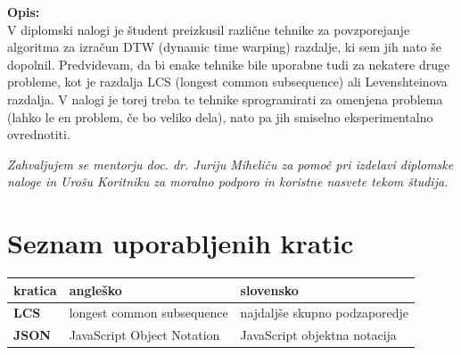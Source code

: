 \documentclass[a4paper,12pt,openright]{book}
\newcommand{\clearemptydoublepage}{\newpage{\pagestyle{empty}\cleardoublepage}}
\begin{document}
\bigskip
\noindent\textbf{Opis:}\\
V diplomski nalogi \cite{diplomaPremk} je študent preizkusil različne tehnike za povzporejanje algoritma za izračun DTW (dynamic time warping) razdalje, ki sem jih nato še dopolnil. Predvidevam, da bi enake tehnike bile uporabne tudi za nekatere druge probleme, kot je razdalja LCS (longest common subsequence) ali Levenshteinova razdalja. V nalogi je torej treba te tehnike sprogramirati za omenjena problema (lahko le en problem, če bo veliko dela), nato pa jih smiselno eksperimentalno ovrednotiti.


\vfill

\vspace{2cm}

\clearemptydoublepage

\thispagestyle{empty}\mbox{}\vfill\null\it%
\noindent
Zahvaljujem se mentorju doc. dr. Juriju Miheliču za pomoč pri izdelavi diplomske naloge in Urošu Koritniku za moralno podporo in koristne nasvete tekom študija. 
\rm\normalfont

\clearemptydoublepage

\thispagestyle{empty}\mbox{}{\textheight}\mbox{}\hfill\begin{minipage}{0.55\textwidth}%
\normalfont\end{minipage}

\clearemptydoublepage

\pagestyle{empty}
\def\thepage{}%
\tableofcontents{}

\clearemptydoublepage


\chapter*{Seznam uporabljenih kratic}

\noindent\begin{tabular}{p{}|p{}|p{}}    %
  {\bf kratica} & {\bf angleško}                              & {\bf slovensko} \\ \hline
  {\bf LCS}      & longest common subsequence               & najdaljše skupno podzaporedje \\
  {\bf JSON} & JavaScript Object Notation & JavaScript objektna notacija \\
\end{tabular}
\end{document}
